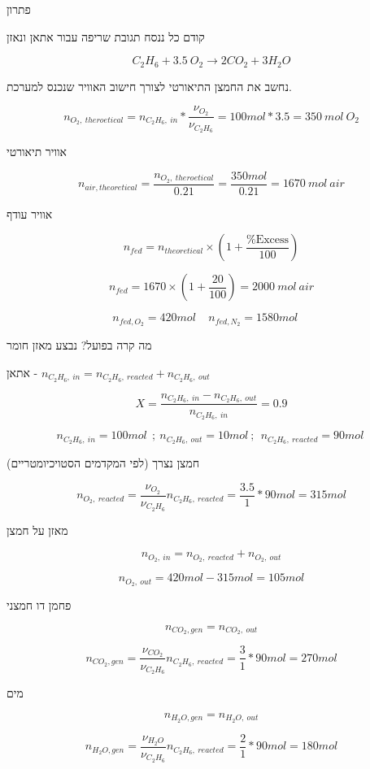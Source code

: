 \documentclass[
  hebrew,
  letterpaper,
  DIV=11,
  numbers=noendperiod]{scrreprt}
\begin{document}
פתרון

קודם כל ננסח תגובת שריפה עבור אתאן ונאזן

\[C_{2}H_{6} + 3.5\ O_{2} \rightarrow 2CO_{2} + 3H_{2}O\]

נחשב את החמצן התיאורטי לצורך חישוב האוויר שנכנס למערכת.

\[n_{O_{2},\ theroetical} = n_{C_{2}H_{6},\ in}*\frac{\nu_{O_{2}}}{\nu_{C_{2}H_{6}}} = 100mol*3.5 = 350\ mol\ O_{2}\]

אוויר תיאורטי

\[n_{air,theoretical} = \frac{n_{O_{2},\ theroetical}}{0.21} = \frac{350mol}{0.21} = 1670\ mol\ air\]

אוויר עודף

\[n_{fed} = n_{theoretical} \times \left( 1 + \frac{\%\text{Excess}}{100} \right)\]

\[n_{fed} = 1670 \times \left( 1 + \frac{20}{100} \right) = 2000\ mol\ air\]

\[n_{fed,O_{2}} = 420mol\ \ \ \ \ n_{fed,N_{2}} = 1580mol\ \ \ \ \ \]

מה קרה בפועל? נבצע מאזן חומר

אתאן -
\(n_{C_{2}H_{6},\ in} = n_{C_{2}H_{6},\ reacted} + n_{C_{2}H_{6},\ out}\)

\[X = \frac{n_{C_{2}H_{6},\ in} - n_{C_{2}H_{6},\ out}}{n_{C_{2}H_{6},\ in}} = 0.9\]

\[n_{C_{2}H_{6},\ in} = 100mol\ \ ;\ n_{C_{2}H_{6},\ out} = 10mol\ ;\ \ n_{C_{2}H_{6},\ reacted} = 90mol\ \]

חמצן נצרך (לפי המקדמים הסטויכיומטריים)

\[n_{O_{2},\ reacted} = \frac{\nu_{O_{2}}}{\nu_{C_{2}H_{6}}}n_{C_{2}H_{6},\ reacted} = \frac{3.5}{1}*90mol = 315mol\]

מאזן על חמצן

\[n_{O_{2},\ in} = n_{O_{2},\ reacted} + n_{O_{2},\ out}\]

\[n_{O_{2},\ out} = 420mol - 315mol = 105mol\]

פחמן דו חמצני

\[n_{{CO}_{2},gen} = n_{{CO}_{2},\ out}\]

\[n_{{CO}_{2},gen} = \frac{\nu_{{CO}_{2}}}{\nu_{C_{2}H_{6}}}n_{C_{2}H_{6},\ reacted} = \frac{3}{1}*90mol = 270mol\]

מים

\[n_{H_{2}O,gen} = n_{H_{2}O,\ out}\]

\[n_{H_{2}O,gen} = \frac{\nu_{H_{2}O}}{\nu_{C_{2}H_{6}}}n_{C_{2}H_{6},\ reacted} = \frac{2}{1}*90mol = 180mol\]
\end{document}
